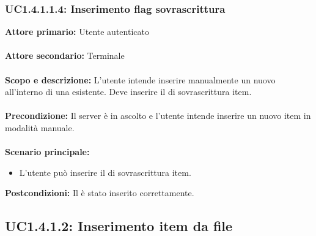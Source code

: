 \documentclass{scalatekids-article}
\begin{document}
\subsubsection{UC1.4.1.1.4: Inserimento flag sovrascrittura}

\textbf{Attore primario:} Utente autenticato\\ \\
\textbf{Attore secondario:} Terminale\\ \\
\textbf{Scopo e descrizione:} L'utente intende inserire manualmente un nuovo  all'interno di una  esistente. Deve inserire il  di sovrascrittura item.\\ \\
\textbf{Precondizione:} Il server è in ascolto e l'utente intende inserire un nuovo item in modalità manuale.\\ \\
\textbf{Scenario principale:}
\begin{itemize}
\item L'utente può inserire il  di sovrascrittura item.
\end{itemize}
\textbf{Postcondizioni:} Il  è stato inserito correttamente.

\subsection{UC1.4.1.2: Inserimento item da file}
\end{document}
